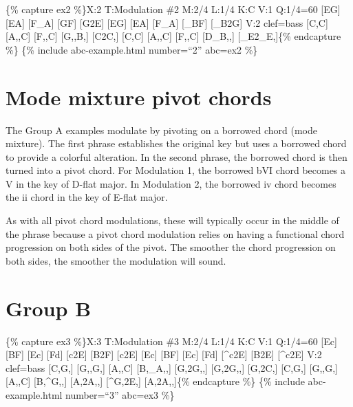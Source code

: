 \documentclass{book}
\begin{document}
\{\% capture ex2 \%\}X:2 T:Modulation \#2 M:2/4 L:1/4 K:C V:1 Q:1/4=60
{[}EG{]} {[}EA{]}\textbar{} {[}F\_A{]} {[}GF{]}\textbar{} {[}G2E{]}\textbar{}
{[}EG{]} {[}EA{]}\textbar{} {[}F\_A{]} {[}\_BF{]}\textbar{}
{[}\_B2G{]}\textbar{]} V:2 clef=bass {[}C,C{]} {[}A,,C{]}\textbar{} {[}F,,C{]}
{[}G,,B,{]}\textbar{} {[}C2C,{]}\textbar{} {[}C,C{]} {[}A,,C{]}\textbar{}
{[}F,,C{]} {[}D\_B,,{]}\textbar{} {[}\_E2\_E,{]}\textbar{]}\{\% endcapture
\%\} \{\% include abc-example.html number=``2'' abc=ex2 \%\}

\hypertarget{mode-mixture-pivot-chords}{%
\section{Mode mixture pivot chords}\label{mode-mixture-pivot-chords}}

The Group A examples modulate by pivoting on a borrowed chord (mode mixture).
The first phrase establishes the original key but uses a borrowed chord to
provide a colorful alteration. In the second phrase, the borrowed chord is
then turned into a pivot chord. For Modulation 1, the borrowed bVI chord
becomes a V in the key of D-flat major. In Modulation 2, the borrowed iv chord
becomes the ii chord in the key of E-flat major.

As with all pivot chord modulations, these will typically occur in the middle
of the phrase because a pivot chord modulation relies on having a functional
chord progression on both sides of the pivot. The smoother the chord
progression on both sides, the smoother the modulation will sound.

\hypertarget{group-b}{%
\section{Group B}\label{group-b}}

\{\% capture ex3 \%\}X:3 T:Modulation \#3 M:2/4 L:1/4 K:C V:1 Q:1/4=60
{[}Ec{]} {[}BF{]}\textbar{} {[}Ec{]} {[}Fd{]}\textbar{} {[}c2E{]}\textbar{}
{[}B2F{]}\textbar{} {[}c2E{]}\textbar{} {[}Ec{]} {[}BF{]}\textbar{} {[}Ec{]}
{[}Fd{]}\textbar{} {[}\^{}c2E{]}\textbar{} {[}B2E{]}\textbar{}
{[}\^{}c2E{]}\textbar{]} V:2 clef=bass {[}C,G,{]} {[}G,,G,{]}\textbar{}
{[}A,,C{]} {[}B,\_A,,{]}\textbar{} {[}G,2G,,{]}\textbar{}
{[}G,2G,,{]}\textbar{} {[}G,2C,{]}\textbar{} {[}C,G,{]} {[}G,,G,{]}\textbar{}
{[}A,,C{]} {[}B,\^{}G,,{]}\textbar{} {[}A,2A,,{]}\textbar{}
{[}\^{}G,2E,{]}\textbar{} {[}A,2A,,{]}\textbar{]}\{\% endcapture \%\} \{\%
include abc-example.html number=``3'' abc=ex3 \%\}
\end{document}
